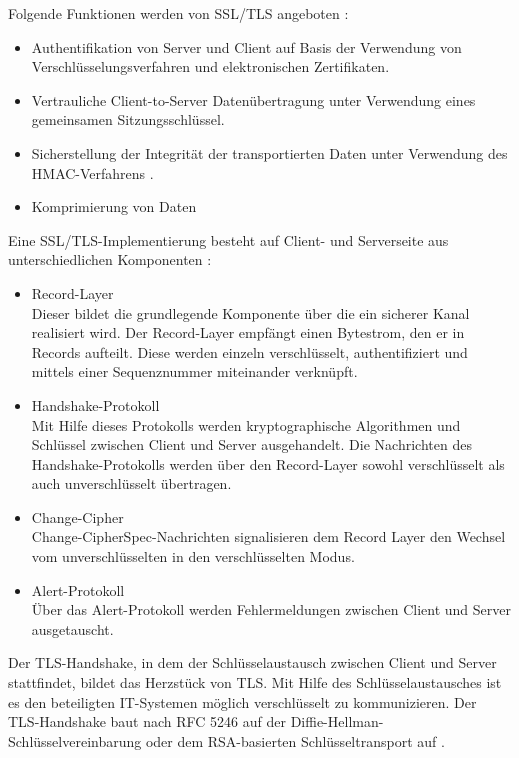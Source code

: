 \bigbreak
Folgende Funktionen werden von SSL/TLS angeboten \autocite{2022C}: 
\begin{itemize}
    \item Authentifikation von Server und Client auf Basis der Verwendung von Verschlüsselungsverfahren und elektronischen Zertifikaten.
    \item Vertrauliche Client-to-Server Datenübertragung unter Verwendung eines gemeinsamen Sitzungsschlüssel.
    \item Sicherstellung der Integrität der transportierten Daten unter Verwendung des HMAC-Verfahrens \autocite{HMAC}.
    \item Komprimierung von Daten 
\end{itemize}
\bigbreak
Eine SSL/TLS-Implementierung besteht auf Client- und Serverseite aus unterschiedlichen Komponenten \autocite{SchwenkJörg2020SuKi}:
\begin{itemize}
    \item Record-Layer\\
    Dieser bildet die grundlegende Komponente über die ein sicherer Kanal realisiert wird. Der Record-Layer empfängt einen Bytestrom, den er in \glqq{}Records\grqq{} aufteilt. Diese werden einzeln verschlüsselt, authentifiziert und mittels einer Sequenznummer miteinander verknüpft. 
    \item Handshake-Protokoll\\
    Mit Hilfe dieses Protokolls werden kryptographische Algorithmen und Schlüssel zwischen Client und Server ausgehandelt. Die Nachrichten des Handshake-Protokolls werden über den Record-Layer sowohl verschlüsselt als auch unverschlüsselt übertragen. 
    \item Change-Cipher\\
    \glqq{}Change-CipherSpec-Nachrichten\grqq{} signalisieren dem Record Layer den Wechsel vom unverschlüsselten in den verschlüsselten Modus. 
    \item Alert-Protokoll\\
    Über das Alert-Protokoll werden Fehlermeldungen zwischen Client und Server ausgetauscht. 
\end{itemize}
\bigbreak
Der TLS-Handshake, in dem der Schlüsselaustausch zwischen Client und Server stattfindet, bildet das Herzstück von TLS. Mit Hilfe des Schlüsselaustausches ist es den beteiligten IT-Systemen möglich verschlüsselt zu kommunizieren. Der TLS-Handshake baut nach \glqq{}RFC 5246\grqq{} auf der \glqq{}Diffie-Hellman-Schlüsselvereinbarung\grqq{} oder dem \glqq{}RSA-basierten Schlüsseltransport\grqq{} auf \autocite{RFC5246} \autocite{RFC5990}.

